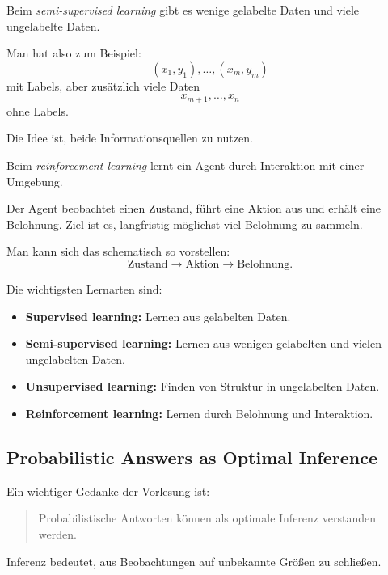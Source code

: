 \documentclass[11pt,a4paper]{scrartcl}
\begin{document}
\begin{solutionbox}
    Beim \emph{semi-supervised learning} gibt es wenige gelabelte Daten und viele
    ungelabelte Daten.

    Man hat also zum Beispiel:
    \[
        (x_1,y_1),\dots,(x_m,y_m)
    \]
    mit Labels, aber zusätzlich viele Daten
    \[
        x_{m+1},\dots,x_n
    \]
    ohne Labels.

    Die Idee ist, beide Informationsquellen zu nutzen.
\end{solutionbox}

\begin{solutionbox}
    Beim \emph{reinforcement learning} lernt ein Agent durch Interaktion mit
    einer Umgebung.

    Der Agent beobachtet einen Zustand, führt eine Aktion aus und erhält eine
    Belohnung. Ziel ist es, langfristig möglichst viel Belohnung zu sammeln.

    Man kann sich das schematisch so vorstellen:
    \[
        \text{Zustand}
        \longrightarrow
        \text{Aktion}
        \longrightarrow
        \text{Belohnung}.
    \]
\end{solutionbox}

\begin{answerbox}
    Die wichtigsten Lernarten sind:

    \begin{itemize}
        \item \textbf{Supervised learning:} Lernen aus gelabelten Daten.
        \item \textbf{Semi-supervised learning:} Lernen aus wenigen gelabelten und vielen ungelabelten Daten.
        \item \textbf{Unsupervised learning:} Finden von Struktur in ungelabelten Daten.
        \item \textbf{Reinforcement learning:} Lernen durch Belohnung und Interaktion.
    \end{itemize}
\end{answerbox}

\subsection{Probabilistic Answers as Optimal Inference}

\begin{notebox}
    Ein wichtiger Gedanke der Vorlesung ist:

    \begin{quote}
        Probabilistische Antworten können als optimale Inferenz verstanden werden.
    \end{quote}

    Inferenz bedeutet, aus Beobachtungen auf unbekannte Größen zu schließen.
\end{notebox}
\end{document}
